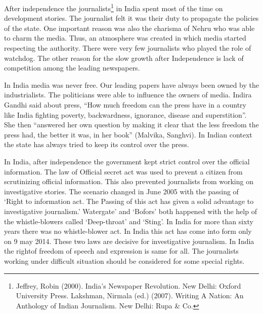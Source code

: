 \begin{multicols}{2}
\vspace{-.1cm}

\noi
After independence the journalists\footnote{Jeffrey, Robin (2000). India’s Newspaper Revolution. New Delhi: Oxford University Press. Lakshman, Nirmala (ed.) (2007). Writing A Nation: An Anthology of Indian Journalism. New Delhi: Rupa \& Co.} in India spent most of the time on development stories.
The journalist felt it was their duty to propagate the policies of the state. One important reason was also the charisma of Nehru who was able to charm the media. Thus, an atmosphere was
created in which media started respecting the authority. There were very few journalists who
played the role of watchdog. The other reason for the slow growth after Independence is lack
of competition among the leading newspapers.



\vspace{-.15cm}

\noi
In India media was never free. Our leading papers have always been owned by the
industrialists. The politicians were able to influence the owners of media. Indira Gandhi said
about press, “How much freedom can the press have in a country like India fighting poverty,
backwardness, ignorance, disease and superstition”. She then “answered her own question by
making it clear that the less freedom the press had, the better it was, in her book” (Malvika,
Sanghvi). In Indian context the state has always tried to keep its control over the press.

\vspace{-.15cm}


\vspace{-.15cm}

\noi
In India, after independence the government kept strict control over the official information.
The law of Official secret act was used to prevent a citizen from scrutinizing official
information. This also prevented journalists from working on investigative stories. The
scenario changed in June 2005 with the passing of ‘Right to information act. The Passing of
this act has given a solid advantage to investigative journalism.’ Watergate’ and ‘Bofors’ both
happened with the help of the whistle-blowers called ‘Deep-throat’ and ‘Sting’. In India for
more than sixty years there was no whistle-blower act. In India this act has come into form only
on 9 may 2014. These two laws are decisive for investigative journalism. In India the rightof
freedom of speech and expression is same for all. The journalists working under difficult
situation should be considered for some special rights.


\end{multicols}

